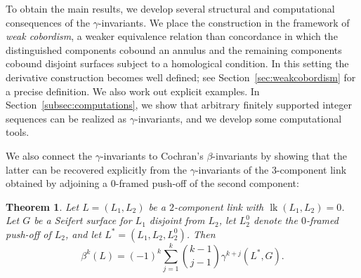 \documentclass[a4paper, 11pt]{amsart}
\newtheorem{theorem}{Theorem}[section]
\theoremstyle{definition}
\newcommand{\Z}{\mathbb{Z}}
\newcommand{\lk}{\operatorname{lk}}
\begin{document}
To obtain the main results, we develop several structural and computational consequences of the $\gamma$-invariants. We place the construction in the framework of \emph{weak cobordism}, a weaker equivalence relation than concordance in which the distinguished components cobound an annulus and the remaining components cobound disjoint surfaces subject to a  homological condition. In this setting the derivative construction becomes well defined; see Section~\ref{sec:weakcobordism} for a precise definition. We also work out explicit examples. In Section~\ref{subsec:computations}, we show that arbitrary finitely supported integer sequences can be realized as $\gamma$-invariants, and we develop some computational tools.








We also connect the $\gamma$-invariants to Cochran's $\beta$-invariants by showing that the latter can be recovered explicitly from the $\gamma$-invariants of the $3$-component link obtained by adjoining a $0$-framed push-off of the second component:

\begin{theorem}\label{thm:beta-from-gamma}
Let $L=(L_1,L_2)$ be a $2$-component link with $\lk(L_1,L_2)=0$. Let $G$ be a Seifert surface for
$L_1$ disjoint from $L_2$, let $L_2^0$ denote the $0$-framed push-off of $L_2$, and let
$L^\ast=(L_1,L_2,L_2^0)$. Then
\[
\beta^k(L)=(-1)^k\sum_{j=1}^k \binom{k-1}{j-1}\gamma^{k+j}(L^\ast,G).
\]
\end{theorem}


\end{document}
